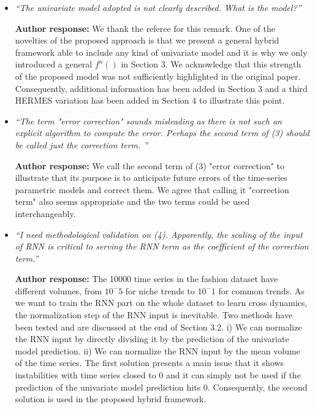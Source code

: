 \documentclass[10pt]{article} %
\begin{document}
\begin{itemize}
	\item {\em ``The univariate model adopted is not clearly described. What is the model?''} \medskip
	
	\textbf{Author response:} We thank the referee for this remark. One of the novelties of the proposed approach is that we present a general hybrid framework able to include any kind of univariate model and it is why we only introduced a general $f^n()$ in Section 3. We acknowledge that this strength of the proposed model was not sufficiently highlighted in the original paper. Consequently, additional information has been added in Section 3 and a third HERMES variation has been added in Section 4 to illustrate this point.\\
	
	\item {\em ``The term "error correction" sounds misleading as there is not such an explicit algorithm to compute the error. Perhaps the second term of (3) should be called just the correction term. ''} \medskip
	
	\textbf{Author response:} We call the second term of (3) "error correction" to illustrate that its purpose is to anticipate future errors of the time-series parametric models and correct them. We agree that calling it "correction term" also seems appropriate and the two terms could be used interchangeably.\\
	
	\item {\em ``I need methodological validation on (4). Apparently, the scaling of the input of RNN is critical to serving the RNN term as the coefficient of the correction term.''} \medskip
	
	\textbf{Author response:} The 10000 time series in the fashion dataset have different volumes, from $10^-5$ for niche trends to $10^-1$ for common trends. As we want to train the RNN part on the whole dataset to learn cross dynamics, the normalization step of the RNN input is inevitable. Two methods have been tested and are discussed at the end of Section 3.2. i) We can normalize the RNN input by directly dividing it by the prediction of the univariate model prediction. ii) We can normalize the RNN input by the mean volume of the time series. The first solution presents a main issue that it shows instabilities with time series closed to 0 and it can simply not be used if the prediction of the univariate model prediction hits 0. Consequently, the second solution is used in the proposed hybrid framework.\\
\end{itemize}
\end{document}
